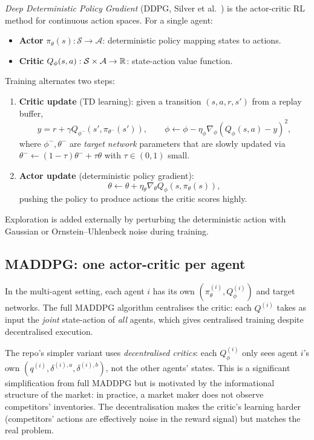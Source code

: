 \emph{Deep Deterministic Policy Gradient} (DDPG, Silver et al.\ \cite{silver2014}) is the actor-critic RL method for continuous action spaces. For a single agent:
\begin{itemize}
  \item \textbf{Actor} $\pi_\theta(s) : \mathcal{S} \to \mathcal{A}$: deterministic policy mapping states to actions.
  \item \textbf{Critic} $Q_\phi(s, a) : \mathcal{S} \times \mathcal{A} \to \mathbb{R}$: state-action value function.
\end{itemize}
Training alternates two steps:
\begin{enumerate}[leftmargin=2em]
  \item \textbf{Critic update} (TD learning): given a transition $(s, a, r, s')$ from a replay buffer,
  \begin{equation}
    y = r + \gamma Q_{\phi^-}(s', \pi_{\theta^-}(s')), \qquad \phi \leftarrow \phi - \eta_\phi \nabla_\phi (Q_\phi(s, a) - y)^2,
  \end{equation}
  where $\phi^-, \theta^-$ are \emph{target network} parameters that are slowly updated via $\theta^- \leftarrow (1 - \tau) \theta^- + \tau \theta$ with $\tau \in (0, 1)$ small.
  \item \textbf{Actor update} (deterministic policy gradient):
  \begin{equation}
    \theta \leftarrow \theta + \eta_\theta \nabla_\theta Q_\phi(s, \pi_\theta(s)),
  \end{equation}
  pushing the policy to produce actions the critic scores highly.
\end{enumerate}
Exploration is added externally by perturbing the deterministic action with Gaussian or Ornstein--Uhlenbeck noise during training.

\subsection{MADDPG: one actor-critic per agent}

In the multi-agent setting, each agent $i$ has its own $(\pi^{(i)}_\theta, Q^{(i)}_\phi)$ and target networks. The full MADDPG algorithm centralises the critic: each $Q^{(i)}$ takes as input the \emph{joint} state-action of \emph{all} agents, which gives centralised training despite decentralised execution.

The repo's simpler variant uses \emph{decentralised critics}: each $Q^{(i)}_\phi$ only sees agent $i$'s own $(q^{(i)}, \delta^{(i), a}, \delta^{(i), b})$, not the other agents' states. This is a significant simplification from full MADDPG but is motivated by the informational structure of the market: in practice, a market maker does not observe competitors' inventories. The decentralisation makes the critic's learning harder (competitors' actions are effectively noise in the reward signal) but matches the real problem.

